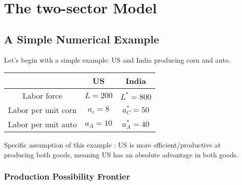 \section{The two-sector Model}

\subsection{A Simple Numerical Example}

Let's begin with a simple example: US and India producing corn and auto.
\begin{table}[htbp!]
    \centering
    \begin{tabular}{c|cc}
        \hline
        & US & India \\
        \hline
        Labor force & $L=200$ & $L^*=800$ \\
        Labor per unit corn & $a_c=8$ & $a_C^*=50$ \\
        Labor per unit auto & $a_A=10$ & $a_A^*=40$ \\
        \hline
    \end{tabular}
\end{table}

Specific assumption of this example : US is more
efficient/productive at producing both goods, meaning
US has an absolute advantage in both goods.

\subsubsection{Production Possibility Frontier}

